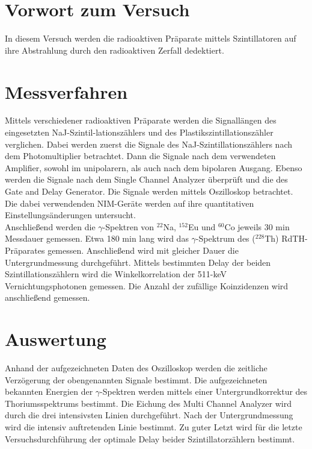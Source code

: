 \documentclass[11pt,a4paper]{article}
\begin{document}
\section{Vorwort zum Versuch}
In diesem Versuch werden die radioaktiven Präparate mittels Szintillatoren auf ihre Abstrahlung durch den radioaktiven Zerfall dedektiert.\\
\section{Messverfahren}
Mittels verschiedener radioaktiven Präparate werden die Signallängen des eingesetzten NaJ-Szintil-lationszählers und des Plastikszintillationszähler verglichen. Dabei werden zuerst die Signale des NaJ-Szintillationszählers nach dem Photomultiplier betrachtet. Dann die Signale nach dem verwendeten Amplifier, sowohl im unipolarern, als auch nach dem bipolaren Ausgang. Ebenso werden die Signale nach dem Single Channel Analyzer überprüft und die des Gate and Delay Generator. Die Signale werden mittels Oszilloskop betrachtet.\\
Die dabei verwendenden NIM-Geräte werden auf ihre quantitativen Einstellungsänderungen untersucht.\\ Anschließend werden die $\gamma$-Spektren von $^{22}$Na, $^{152}$Eu und $^{60}$Co jeweils 30 min Messdauer gemessen. 
Etwa 180 min lang wird das $\gamma$-Spektrum des ($^{228}$Th) RdTH-Präparates gemessen. 
Anschließend wird mit gleicher Dauer die Untergrundmessung durchgeführt. Mittels bestimmten Delay der beiden Szintillationszählern wird die Winkelkorrelation der 511-keV Vernichtungsphotonen gemessen. Die Anzahl der zufällige Koinzidenzen wird anschließend gemessen.
\section{Auswertung}
Anhand der aufgezeichneten Daten des Oszilloskop werden die zeitliche Verzögerung der obengenannten Signale bestimmt. Die aufgezeichneten bekannten Energien der $\gamma$-Spektren werden mittels einer Untergrundkorrektur des Thoriumsspektrums bestimmt. Die Eichung des Multi Channel Analyzer wird durch die drei intensivsten Linien durchgeführt.
Nach der Untergrundmessung wird die intensiv auftretenden Linie bestimmt.
Zu guter Letzt wird für die letzte Versuchsdurchführung der optimale Delay beider Szintillatorzählern bestimmt.
\end{document}
